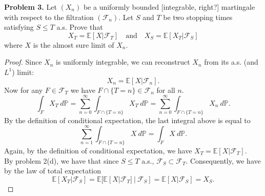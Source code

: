 \documentclass[11pt,letterpaper]{report}
\newcommand{\mcal}[1]{\mathcal{#1}}
\newcommand{\E}{\mathbb{E}}
\newcommand{\Prob}{\mathbb{P}}
\begin{document}
\noindent\textbf{Problem 3. }
Let $(X_n)$ be a uniformly bounded [integrable, right?] martingale with respect to the filtration $(\mcal{F}_n)$. Let $S$ and $T$ be two stopping times satisfying $S\leq T$ a.s. Prove that
\[
X_T = \E[X|\mcal{F}_T]\quad\text{and}\quad X_S = \E[X_T|\mcal{F}_S]
\]
where $X$ is the almost sure limit of $X_n$.
\begin{proof}
	Since $X_n$ is uniformly integrable, we can reconstruct $X_n$ from its a.s. (and $L^1$) limit:
	\[
	X_n = \E[X|\mcal{F}_n].
	\]
	Now for any $F\in \mcal{F}_T$ we have $F\cap \{T=n\} \in \mcal{F}_n$ for all $n$.
	\[
	\int_FX_T\ d\Prob = \sum_{n=0}^\infty\int_{F\cap \{T=n\}}X_T\ d\Prob = \sum_{n=0}^\infty \int_{F\cap \{T = n\}}X_n\ d\Prob.
	\]
	By the definition of conditional expectation, the last integral above is equal to
	\[
	\sum_{n=1}^\infty\int_{F\cap \{T = n\}}X\ d\Prob = \int_FX\ d\Prob.
	\]
	Again, by the definition of conditional expectation, we have $X_T = \E[X|\mcal{F}_T]$.\\

	\noindent By problem 2(d), we have that since $S\leq T$ a.s., $\mcal{F}_S\subset \mcal{F}_T$. Consequently, we have by the law of total expectation
	\[
	\E[X_T|\mcal{F}_S] = \E[\E[X|\mcal{F}_T]\ |\ \mcal{F}_S] = \E[X|\mcal{F}_S] = X_S.
	\]
\end{proof}
\end{document}
